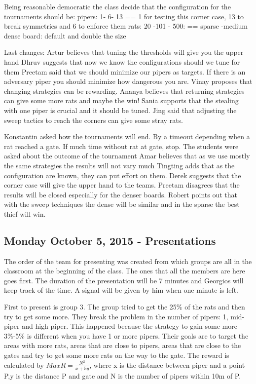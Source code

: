 Being reasonable democratic the class decide that the configuration for the tournaments should be:
pipers: 1- 6- 13 == 1 for testing this corner case, 13 to break symmetries and 6 to enforce them
rats: 20 -101 - 500: == sparse -medium dense
board: default and double the size

Last changes:
Artur believes that tuning the thresholds will give you the upper hand
Dhruv suggests that now we know the configurations should we tune for them
Preetam said that we should minimize our pipers as targets. If there is an 
adversary piper you should minimize how dangerous you are.
Vinay proposes that changing strategies can be rewarding.
Ananya believes that returning strategies can give some more rats and maybe the win!
Sania supports that the stealing with one piper is crucial and it should be tuned.
Jing said that adjusting the sweep tactics to reach the corners can give some 
stray rats.

Konstantin asked how the tournaments will end. By a timeout depending when a rat 
reached a gate. If much time without rat at gate, stop.
The students were asked about the outcome of the tournament
Amar believes that as we use mostly the same strategies the results will not vary much
Tingting adds that as the configuration are known, they can put effort on them.
Derek suggests that the corner case will give the upper hand to the teams.
Preetam disagrees that the results will be closed especially for the denser boards.
Robert points out that with the sweep techniques the dense will be similar and in the sparse the best thief will win.

\subsection{Monday October 5, 2015 - Presentations}

The order of the team for presenting was created from which groups are all in the
classroom at the beginning of the class. The ones that all the members are here
goes first. The duration of the presentation will be 7 minutes and Georgios will 
keep track of the time. A signal will be given by him when one minute is left.

First to present is group 3.
The group tried to get the 25\% of the rats and then try to get some more. They
break the problem in the number of pipers: 1, mid-piper and high-piper. This
happened because the strategy to gain some more 3\%-5\% is different when you
have 1 or more pipers. Their goals are to target the areas with more rats, areas
that are close to pipers, areas that are close to the gates and try to get some
more rats on the way to the gate. The reward is calculated by $Max R = \frac{N^2}{x+5y}$, 
where x is the distance between piper and a point P,y is the distance P and gate
 and N is the number of pipers within 10m of P.

